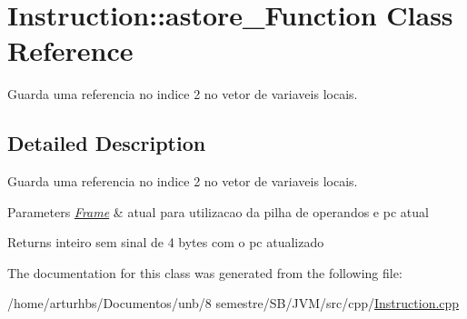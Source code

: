 \hypertarget{classInstruction_1_1astore__2Function}{}\section{Instruction\+:\+:astore\+\_\+Function Class Reference}
\label{classInstruction_1_1astore__2Function}


Guarda uma referencia no indice 2 no vetor de variaveis locais.  




\subsection{Detailed Description}
Guarda uma referencia no indice 2 no vetor de variaveis locais. 


\begin{DoxyParams}{Parameters}
{\em \hyperlink{classFrame}{Frame}} & atual para utilizacao da pilha de operandos e pc atual \\
\hline
\end{DoxyParams}
\begin{DoxyReturn}{Returns}
inteiro sem sinal de 4 bytes com o pc atualizado 
\end{DoxyReturn}


The documentation for this class was generated from the following file\+:\begin{DoxyCompactItemize}
\item 
/home/arturhbs/\+Documentos/unb/8 semestre/\+S\+B/\+J\+V\+M/src/cpp/\hyperlink{Instruction_8cpp}{Instruction.\+cpp}\end{DoxyCompactItemize}
